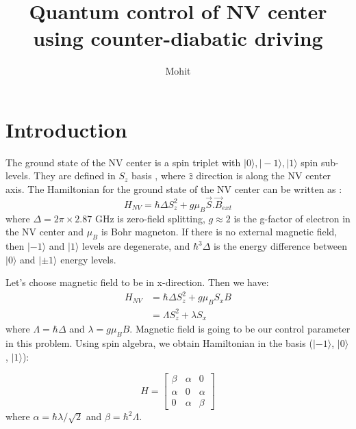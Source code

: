 \documentclass[11pt,a4paper]{article}
\author{Mohit}
\title{Quantum control of NV center using counter-diabatic driving  }
\begin{document}
\maketitle

\section{Introduction}
The ground state of the NV center is a spin triplet with $| 0 \rangle, | -1 \rangle, | 1 \rangle$ spin sub-levels. They are defined in $S_z$ basis , where $\hat{z}$ direction is along the NV center axis. The Hamiltonian for the ground state of the NV center can be written as \cite{dhingra2017nitrogen}:
\begin{equation}
H_{NV}= \hbar \Delta S_z^2 + g \mu_B \vec{S}. \vec{B}_{ext} 
\end{equation}
where $\Delta= 2 \pi \times 2.87 $ GHz is zero-field splitting, $g \approx 2$ is the g-factor of electron in the NV center and $\mu_B$ is Bohr magneton. If there is no external magnetic field, then $| -1 \rangle$ and $| 1 \rangle$ levels are degenerate, and  $ \hbar^3 \Delta$ is the energy difference between $| 0 \rangle$ and $| \pm 1 \rangle$ energy levels.


Let's choose magnetic field to be in x-direction. Then we have:
\begin{align*}
H_{NV} &= \hbar \Delta S_z^2 + g \mu_B   S_x  B \\
 &= \Lambda S_z^2 + \lambda   S_x  
\end{align*}
where $\Lambda= \hbar \Delta $ and $\lambda=g \mu_B    B $. Magnetic field is going to be our control parameter in this problem. Using spin algebra, we obtain Hamiltonian in the basis ($|- 1\rangle$, $| 0 \rangle$ , $| 1 \rangle$):

\begin{equation}
H= \begin{bmatrix}
    \beta       & \alpha  & 0  \\
    \alpha       & 0 &\alpha  \\
     0       & \alpha & \beta
\end{bmatrix}
\end{equation}
where $\alpha= \hbar \lambda/ \sqrt{2} $ and $\beta= \hbar^2 \Lambda$.
\end{document}
